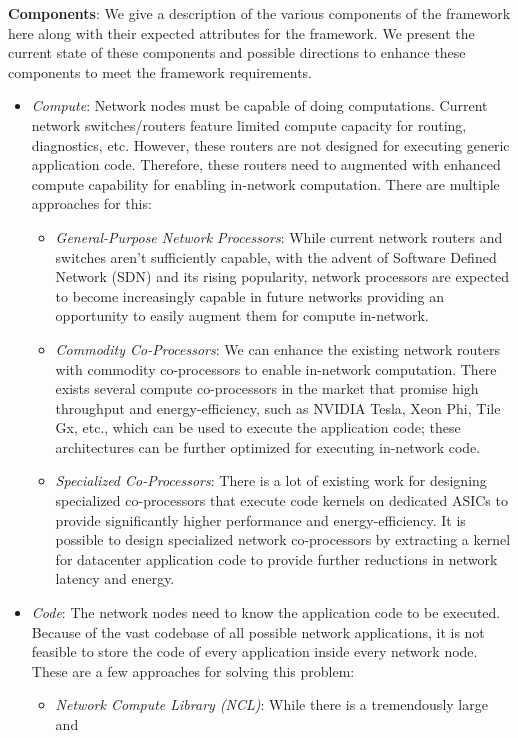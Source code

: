 \documentclass[10pt,letter,twocolumn]{article}
\begin{document}
\textbf{Components}: We give a description of the various components of the framework
here along with their expected attributes for the framework. We present the current
state of these components and possible directions to enhance these components to meet
the framework requirements.
\begin{itemize}
\item \textit{Compute}: Network nodes must be capable of doing computations. Current
network switches/routers feature limited compute capacity for routing, diagnostics,
etc. However, these routers are not designed for executing generic application code.
Therefore, these routers need to augmented with enhanced compute capability for
enabling in-network computation. There are multiple approaches for this:
\begin{itemize}
\item \textit{General-Purpose Network Processors}: While current network routers and
switches aren’t sufficiently capable, with the advent of Software Defined Network (SDN)
and its rising popularity, network processors are expected to become increasingly
capable in future networks providing an opportunity to easily augment them for compute
in-network.
\item \textit{Commodity Co-Processors}: We can enhance the existing network routers
with commodity co-processors to enable in-network computation. There exists several
compute co-processors in the market that promise high throughput and energy-efficiency,
such as NVIDIA Tesla, Xeon Phi, Tile Gx, etc., which can be used to execute the
application code; these architectures can be further optimized for executing in-network
code.
\item \textit{Specialized Co-Processors}: There is a lot of existing work for designing
specialized co-processors that execute code kernels on dedicated ASICs to provide
significantly higher performance and energy-efficiency. It is possible to design
specialized network co-processors by extracting a kernel for datacenter application
code to provide further reductions in network latency and energy.
\end{itemize}
\item \textit{Code}: The network nodes need to know the application code to be executed.
Because of the vast codebase of all possible network applications, it is not feasible to
store the code of every application inside every network node. These are a few approaches
for solving this problem:
\begin{itemize}
\item \textit{Network Compute Library (NCL)}: While there is a tremendously large and

\end{itemize}
\end{itemize}
\end{document}
